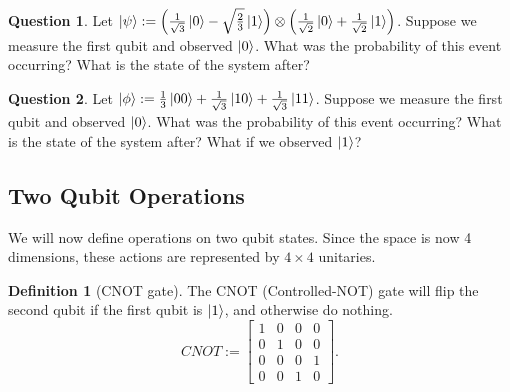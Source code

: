 \documentclass[letterpaper, 12pt]{article}
\newcommand{\1}{\mathds{1}}	%
\theoremstyle{definition}
\newtheorem{definition}[theorem]{Definition}
\newtheorem{question}{Question}
\begin{document}
\begin{question}
    Let $\ket{\psi} := \left( \frac{1}{\sqrt{3}} \ket{0} - \sqrt{\frac{2}{3}}\ket{1}\right) \otimes \left( \frac{1}{\sqrt{2}} \ket{0} +  \frac{1}{\sqrt{2}} \ket{1}\right)$. Suppose we measure the first qubit and observed $\ket{0}$. What was the probability of this event occurring? What is the state of the system after? 
\end{question}
\vspace{30mm}

\begin{question}
    Let $\ket{\phi} := \frac{1}{3}\ket{00} + \frac{1}{\sqrt{3}} \ket{10} + \frac{1}{\sqrt{3}}\ket{11}$. Suppose we measure the first qubit and observed $\ket{0}$. What was the probability of this event occurring? What is the state of the system after? What if we observed $\ket{1}$?
\end{question}
\vspace{30mm}

\newpage 
\subsection{Two Qubit Operations}

We will now define operations on two qubit states. Since the space is now 4 dimensions, these actions are represented by $4 \times 4$ unitaries. 

\begin{definition}[CNOT gate]
    The CNOT (Controlled-NOT) gate will flip the second qubit if the first qubit is $\ket{1}$, and otherwise do nothing. 
    \begin{equation}
        CNOT := \begin{bmatrix}
            1 & 0 & 0 & 0\\ 0 & 1 & 0 & 0 \\ 0 & 0 & 0 & 1 \\ 0 & 0 & 1 & 0
        \end{bmatrix}.
    \end{equation}
\end{definition}
\end{document}
